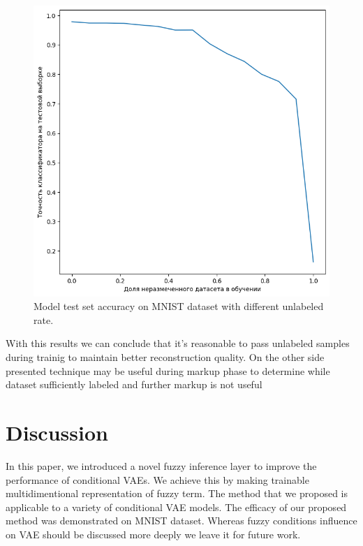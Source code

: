 \documentclass[runningheads]{llncs}
\begin{document}
\begin{figure}[h]  
    \centering
    \includegraphics[width=1\textwidth]{fig5-accuracy-vs-unlabeled-rate.png}
    \caption{ Model test set accuracy on MNIST dataset with different unlabeled rate. }\label{fig:accuracy-vs-unlabeled-rate}
\end{figure}

With this results we can conclude that it's reasonable to pass unlabeled samples during trainig to maintain better reconstruction quality.
On the other side presented technique may be useful during markup phase to determine while dataset sufficiently labeled and further markup is not useful

\section{Discussion}

In this paper, we introduced a novel fuzzy inference layer to improve the performance of conditional VAEs. 
We achieve this by making trainable multidimentional representation of fuzzy term.
The method that we proposed is applicable to a variety of conditional VAE models. 
The efficacy of our proposed method was demonstrated on MNIST dataset. 
Whereas fuzzy conditions influence on VAE should be discussed more deeply we leave it for future work. 



\end{document}
